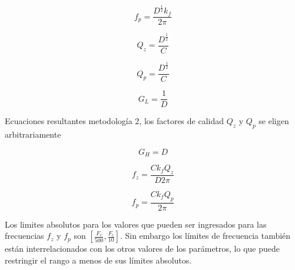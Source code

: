 		\begin{equation}
			f_{p} = \frac{D^{\frac{1}{2}} k_{f}}{2 \pi}
		\end{equation}
		
		\begin{equation}
			Q_{z} = \frac{D^{\frac{1}{2}}}{C}
		\end{equation}
		
		\begin{equation}
			Q_{p} = \frac{D^{\frac{1}{2}}}{C}	
		\end{equation}
		
		\begin{equation}
			G_{L} = \frac{1}{D}
		\end{equation}
		
		Ecuaciones resultantes metodología 2, los factores de calidad $Q_{z}$ y $Q_{p}$ se eligen arbitrariamente  
		
		\begin{equation}
			G_{H} = D
		\end{equation}
		
		\begin{equation}
			f_{z} = \frac{C k_{f} Q_{z}}{D 2 \pi}	
		\end{equation}
		
		\begin{equation}
			f_{p} = \frac{C k_{f} Q_{p}}{ 2 \pi}	
		\end{equation}
		
	Los limites absolutos para los valores que pueden ser ingresados para las frecuencias $f_{z}$ y $f_{p}$ son $[\frac{F_{c}}{500}, \frac{F_{c}}{10}]$. Sin embargo los límites de frecuencia también están interrelacionados con los otros valores de los parámetros, lo que puede restringir el rango a menos de sus límites absolutos. 